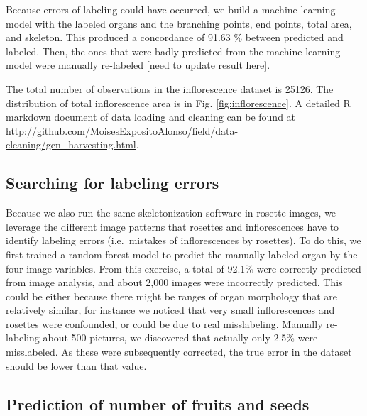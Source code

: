 \documentclass[12pt,]{article}
\begin{document}
Because errors of labeling could have occurred, we build a machine
learning model with the labeled organs and the branching points, end
points, total area, and skeleton. This produced a concordance of 91.63
\% between predicted and labeled. Then, the ones that were badly
predicted from the machine learning model were manually re-labeled
{[}need to update result here{]}.

The total number of observations in the inflorescence dataset is 25126.
The distribution of total inflorescence area is in Fig.
\ref{fig:inflorescence}. A detailed R markdown document of data loading
and cleaning can be found at
\url{http://github.com/MoisesExpositoAlonso/field/data-cleaning/gen_harvesting.html}.

\subsection{Searching for labeling
errors}\label{searching-for-labeling-errors}

Because we also run the same skeletonization software in rosette images,
we leverage the different image patterns that rosettes and
inflorescences have to identify labeling errors (i.e.~mistakes of
inflorescences by rosettes). To do this, we first trained a random
forest model to predict the manually labeled organ by the four image
variables. From this exercise, a total of 92.1\% were correctly
predicted from image analysis, and about 2,000 images were incorrectly
predicted. This could be either because there might be ranges of organ
morphology that are relatively similar, for instance we noticed that
very small inflorescences and rosettes were confounded, or could be due
to real misslabeling. Manually re-labeling about 500 pictures, we
discovered that actually only 2.5\% were misslabeled. As these were
subsequently corrected, the true error in the dataset should be lower
than that value.

\subsection{Prediction of number of fruits and
seeds}\label{prediction-of-number-of-fruits-and-seeds}
\end{document}
